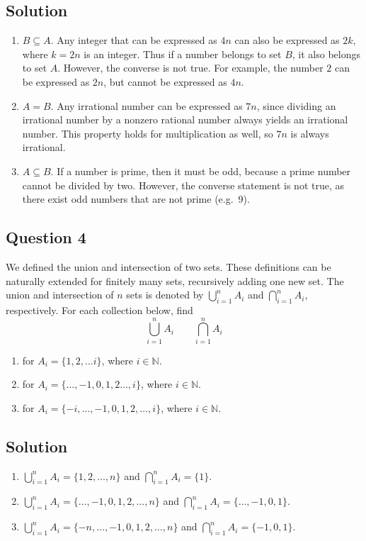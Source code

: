 \documentclass{article}
\begin{document}
\subsection*{Solution}
    \begin{enumerate}
        \item $B \subseteq A$. Any integer that can be expressed as $4n$ can also be expressed as $2k$, where $k = 2n$ is an integer. Thus if a number belongs to set $B$, it also belongs to set $A$. However, the converse is not true. For example, the number $2$ can be expressed as $2n$, but cannot be expressed as $4n$.
        \item $A = B$. Any irrational number can be expressed as $7n$, since dividing an irrational number by a nonzero rational number always yields an irrational number. This property holds for multiplication as well, so $7n$ is always irrational.
        \item $A \subseteq B$. If a number is prime, then it must be odd, because a prime number cannot be divided by two. However, the converse statement is not true, as there exist odd numbers that are not prime (e.g.\ 9).
    \end{enumerate}

\subsection*{Question 4}
    We defined the union and intersection of two sets. These definitions can be naturally extended for finitely many sets, recursively adding one new set. The union and intersection of $n$ sets is denoted by $%
    \bigcup_{i = 1}^{n} A_{i}$ and $%
    \bigcap_{i = 1}^{n} A_{i}$, respectively.
    For each collection below, find $$\bigcup_{i = 1}^{n} A_{i} \qquad \bigcap_{i = 1}^{n} A_{i}$$
    \begin{enumerate}
        \item for $A_{i} = \{1, 2, \dots i\}$, where $i \in \mathbb{N}$.
        \item for $A_{i} = \{\dots, -1, 0, 1, 2 \dots, i\}$, where $i \in \mathbb{N}$.
        \item for $A_{i} = \{-i, \dots, -1, 0, 1, 2, \dots, i\}$, where $i \in \mathbb{N}$.
    \end{enumerate}

\subsection*{Solution}
    \begin{enumerate}
        \item $\bigcup_{i = 1}^{n} A_{i} = \{1, 2, \dots, n\}$ and $\bigcap_{i = 1}^{n} A_{i} = \{1\}$.
        \item $\bigcup_{i = 1}^{n} A_{i} = \{\dots, -1, 0, 1, 2, \dots, n\}$ and $\bigcap_{i = 1}^{n} A_{i} = \{\dots, -1, 0, 1\}$.
        \item $\bigcup_{i = 1}^{n} A_{i} = \{-n, \dots, -1, 0, 1, 2, \dots, n\}$ and $\bigcap_{i = 1}^{n} A_{i} = \{-1, 0, 1\}$.
    \end{enumerate}
\end{document}
